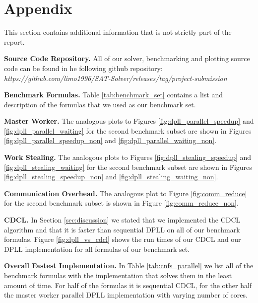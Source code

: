 \documentclass[letterpaper]{article}
\newcommand{\mypar}[1]{{\bf #1.}}
\begin{document}



\newpage
\section{Appendix}
This section contains additional information that is not strictly part of the report.

\mypar{Source Code Repository}
All of our solver, benchmarking and plotting source code can be found in he following github repository:
\textit{https://github.com/limo1996/}\newline\textit{SAT-Solver/releases/tag/project-submission}

\mypar{Benchmark Formulas}
Table \ref{tab:benchmark_set} contains a list and description of the formulas that we used as our benchmark set.

\mypar{Master Worker}
The analogous plots to Figures \ref{fig:dpll_parallel_speedup} and \ref{fig:dpll_parallel_waiting} for the second benchmark subset are shown in Figures \ref{fig:dpll_parallel_speedup_non} and \ref{fig:dpll_parallel_waiting_non}.

\mypar{Work Stealing}
The analogous plots to Figures \ref{fig:dpll_stealing_speedup} and \ref{fig:dpll_stealing_waiting} for the second benchmark subset are shown in Figures \ref{fig:dpll_stealing_speedup_non} and \ref{fig:dpll_stealing_waiting_non}.

\mypar{Communication Overhead}
The analogous plot to Figure \ref{fig:comm_reduce} for the second benchmark subset is shown in Figure \ref{fig:comm_reduce_non}.

\mypar{CDCL}
In Section \ref{sec:discussion} we stated that we implemented the CDCL algorithm and that it is faster than sequential DPLL on all of our benchmark formulas.
Figure \ref{fig:dpll_vs_cdcl} shows the run times of our CDCL and our DPLL implementation for all formulas of our benchmark set.

\mypar{Overall Fastest Implementation}
In Table \ref{tab:cnfs_parallel} we list all of the benchmark formulas with the implementation that solves them in the least amount of time.
For half of the formulas it is sequential CDCL, for the other half the master worker parallel DPLL implementation with varying number of cores.
\end{document}

